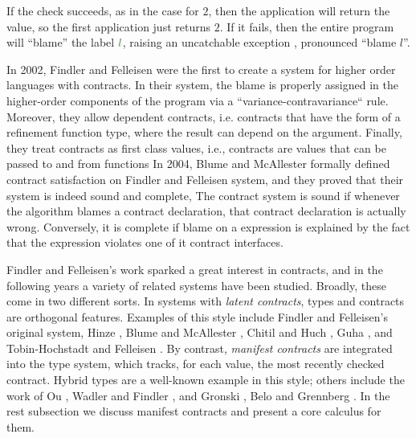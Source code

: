 If the check succeeds, as in the case for $2$,
then the application will return the value, so the first 
application just returns $2$.
If it fails, then the entire program will ``blame'' the label $\mklabel{l}$,
raising an uncatchable exception  , pronounced ``blame $l$''.

\begin{comment}
Assigning blame for contractual violations in higher-order languages
is complex:
%
The boundaries between cooperating components are more obscure 
than in the world with only first-order functions. 
A function may invoke a function passed to it at its call side.
Accordingly, the blame for a corresponding contract violation must 
lie with the supplier of the bad value, 
no matter if the bad value was passed by directly applying 
a function or by applying a base value.
%
\end{comment}
In 2002, Findler and Felleisen \cite{Findler02} were the first to
create a system for higher order languages with contracts.
%
In their system, the blame is properly assigned in the 
higher-order components of the program via a
``variance-contravariance`` rule.
Moreover,
they allow dependent contracts, i.e. 
contracts that have the form of a refinement function type, 
where the result can depend on the argument.
Finally,
they treat contracts as first class values, 
i.e., contracts are values that can be passed to and from functions
%
In 2004, Blume and McAllester \cite{BlumeM06} 
formally defined contract satisfaction on Findler and Felleisen system,
and they proved that their system is indeed
sound and complete, 
%
The contract system is sound if whenever
the algorithm blames a contract declaration, 
that contract declaration is actually wrong.
%
Conversely, it is complete if blame on a expression is explained
by the fact that the expression violates one of it contract interfaces.

Findler and Felleisen's work sparked a great interest
in contracts, and in the following years a variety
of related systems have been studied. 
Broadly, these come in two different sorts. 
%
In systems with \textit{latent contracts}, types and contracts
are orthogonal features. Examples of this style include Findler
and Felleisen's original system, Hinze \etal \cite{Hinze06}, Blume and
McAllester \cite{BlumeM06}, Chitil and Huch \cite{ChitilH07}, Guha \etal \cite{GuhaMFK07},
and Tobin-Hochstadt and Felleisen \cite{Tobin-HochstadtF08}. 
By contrast, \textit{manifest contracts} are integrated into the type system, 
which tracks, for each value, the most recently checked contract. 
Hybrid types \cite{flanagan06} are a well-known example in this style; others include the
work of Ou \etal \cite{Ou2004}, Wadler and Findler \cite{WadlerF09}, and Gronski
\etal \cite{Gronski06}, Belo \etal \cite{Greenberg11} and Grennberg \etal \cite{Greenberg12}.
%
In the rest subsection we discuss manifest contracts and
present a core calculus for them.

